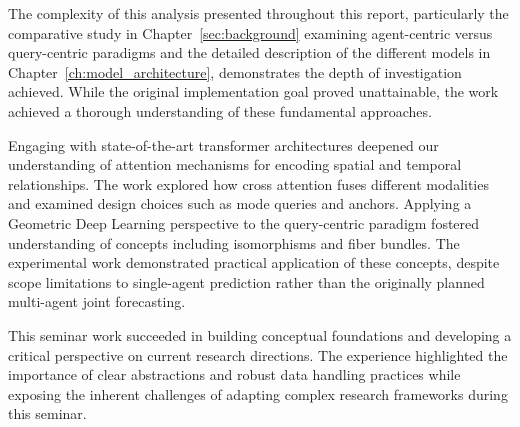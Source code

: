 The complexity of this analysis presented throughout this report, particularly the comparative study in Chapter~\ref{sec:background} examining agent-centric versus query-centric paradigms and the detailed description of the different models in Chapter~\ref{ch:model_architecture}, demonstrates the depth of investigation achieved. While the original implementation goal proved unattainable, the work achieved a thorough understanding of these fundamental approaches.

Engaging with state-of-the-art transformer architectures deepened our understanding of attention mechanisms for encoding spatial and temporal relationships. The work explored how cross attention fuses different modalities and examined design choices such as mode queries and anchors. Applying a Geometric Deep Learning perspective to the query-centric paradigm fostered understanding of concepts including isomorphisms and fiber bundles. The experimental work demonstrated practical application of these concepts, despite scope limitations to single-agent prediction rather than the originally planned multi-agent joint forecasting.

This seminar work succeeded in building conceptual foundations and developing a critical perspective on current research directions. The experience highlighted the importance of clear abstractions and robust data handling practices while exposing the inherent challenges of adapting complex research frameworks during this seminar.
